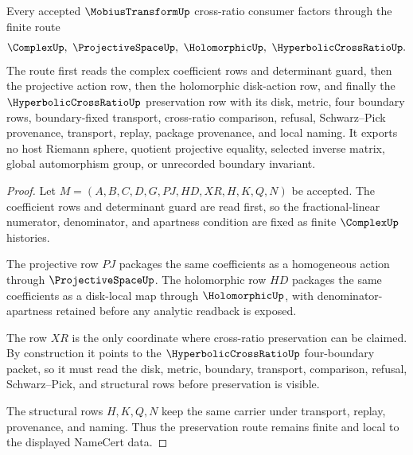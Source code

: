 \begin{theorem}
\label{thm:mobius-transform-cross-ratio-preservation}
Every accepted $\MobiusTransformUp$ cross-ratio consumer factors through the finite route
$$
\ComplexUp,\ \ProjectiveSpaceUp,\ \HolomorphicUp,\ \HyperbolicCrossRatioUp .
$$
The route first reads the complex coefficient rows and determinant guard, then the projective action row, then the holomorphic disk-action row, and finally the $\HyperbolicCrossRatioUp$ preservation row with its disk, metric, four boundary rows, boundary-fixed transport, cross-ratio comparison, refusal, Schwarz--Pick provenance, transport, replay, package provenance, and local naming. It exports no host Riemann sphere, quotient projective equality, selected inverse matrix, global automorphism group, or unrecorded boundary invariant.
\end{theorem}
\begin{proof}
Let $M=(A,B,C,D,G,PJ,HD,XR,H,K,Q,N)$ be accepted. The coefficient rows and determinant guard are read first, so the fractional-linear numerator, denominator, and apartness condition are fixed as finite $\ComplexUp$ histories.

The projective row $PJ$ packages the same coefficients as a homogeneous action through $\ProjectiveSpaceUp$. The holomorphic row $HD$ packages the same coefficients as a disk-local map through $\HolomorphicUp$, with denominator-apartness retained before any analytic readback is exposed.

The row $XR$ is the only coordinate where cross-ratio preservation can be claimed. By construction it points to the $\HyperbolicCrossRatioUp$ four-boundary packet, so it must read the disk, metric, boundary, transport, comparison, refusal, Schwarz--Pick, and structural rows before preservation is visible.

The structural rows $H,K,Q,N$ keep the same carrier under transport, replay, provenance, and naming. Thus the preservation route remains finite and local to the displayed NameCert data.
\end{proof}


